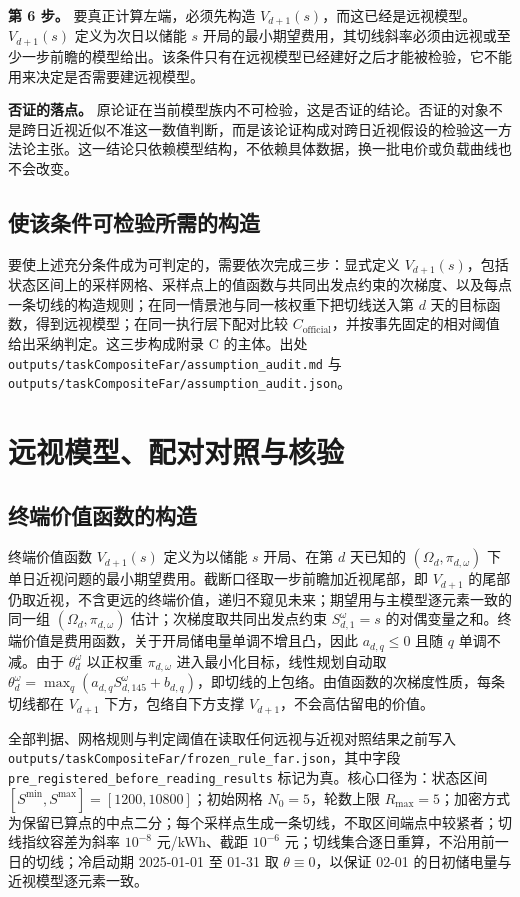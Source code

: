 \begin{appendices}
\textbf{第 6 步。} 要真正计算左端，必须先构造 $V_{d+1}(s)$，而这已经是远视模型。$V_{d+1}(s)$ 定义为次日以储能 $s$ 开局的最小期望费用，其切线斜率必须由远视或至少一步前瞻的模型给出。该条件只有在远视模型已经建好之后才能被检验，它不能用来决定是否需要建远视模型。

\textbf{否证的落点。} 原论证在当前模型族内不可检验，这是否证的结论。否证的对象不是跨日近视近似不准这一数值判断，而是该论证构成对跨日近视假设的检验这一方法论主张。这一结论只依赖模型结构，不依赖具体数据，换一批电价或负载曲线也不会改变。

\subsection{使该条件可检验所需的构造}

要使上述充分条件成为可判定的，需要依次完成三步：显式定义 $V_{d+1}(s)$，包括状态区间上的采样网格、采样点上的值函数与共同出发点约束的次梯度、以及每点一条切线的构造规则；在同一情景池与同一核权重下把切线送入第 $d$ 天的目标函数，得到远视模型；在同一执行层下配对比较 $C_{\mathrm{official}}$，并按事先固定的相对阈值给出采纳判定。这三步构成附录 C 的主体。出处 \texttt{outputs/\allowbreak taskCompositeFar/\allowbreak assumption\_audit.md} 与 \texttt{outputs/\allowbreak taskCompositeFar/\allowbreak assumption\_audit.json}。

\section{远视模型、配对对照与核验}

\subsection{终端价值函数的构造}

终端价值函数 $V_{d+1}(s)$ 定义为以储能 $s$ 开局、在第 $d$ 天已知的 $(\Omega_d,\pi_{d,\omega})$ 下单日近视问题的最小期望费用。截断口径取一步前瞻加近视尾部，即 $V_{d+1}$ 的尾部仍取近视，不含更远的终端价值，递归不窥见未来；期望用与主模型逐元素一致的同一组 $(\Omega_d,\pi_{d,\omega})$ 估计；次梯度取共同出发点约束 $S^\omega_{d,1}=s$ 的对偶变量之和。终端价值是费用函数，关于开局储电量单调不增且凸，因此 $a_{d,q}\le0$ 且随 $q$ 单调不减。由于 $\theta^\omega_d$ 以正权重 $\pi_{d,\omega}$ 进入最小化目标，线性规划自动取 $\theta^\omega_d=\max_q(a_{d,q}S^\omega_{d,145}+b_{d,q})$，即切线的上包络。由值函数的次梯度性质，每条切线都在 $V_{d+1}$ 下方，包络自下方支撑 $V_{d+1}$，不会高估留电的价值。

全部判据、网格规则与判定阈值在读取任何远视与近视对照结果之前写入 \texttt{outputs/\allowbreak taskCompositeFar/\allowbreak frozen\_rule\_far.json}，其中字段 \texttt{pre\_registered\_before\_reading\_results} 标记为真。核心口径为：状态区间 $[S^{\min},S^{\max}]=[1200,10800]$；初始网格 $N_0=5$，轮数上限 $R_{\max}=5$；加密方式为保留已算点的中点二分；每个采样点生成一条切线，不取区间端点中较紧者；切线指纹容差为斜率 $10^{-8}$ 元/kWh、截距 $10^{-6}$ 元；切线集合逐日重算，不沿用前一日的切线；冷启动期 2025-01-01 至 01-31 取 $\theta\equiv0$，以保证 02-01 的日初储电量与近视模型逐元素一致。


\end{appendices}
